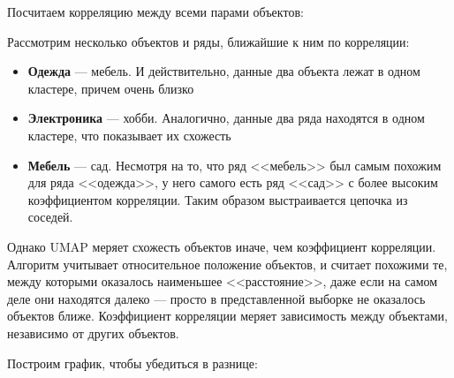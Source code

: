 Посчитаем корреляцию между всеми парами объектов:
\begin{figure}[H]
	\noindent {}
\end{figure}

Рассмотрим несколько объектов и ряды, ближайшие к ним по корреляции:
\begin{itemize}
	\item \textbf{Одежда} --- мебель. И действительно, данные два объекта лежат в одном кластере, причем очень близко
	\item \textbf{Электроника} --- хобби. Аналогично, данные два ряда находятся в одном кластере, что показывает их схожесть
	\item \textbf{Мебель} --- сад. Несмотря на то, что ряд <<мебель>> был самым похожим для ряда <<одежда>>, у него самого есть ряд <<сад>> с более высоким коэффициентом корреляции. Таким образом выстраивается цепочка из соседей.
\end{itemize}

Однако UMAP меряет схожесть объектов иначе, чем коэффициент корреляции. Алгоритм учитывает относительное положение объектов, и считает похожими те, между которыми оказалось наименьшее <<расстояние>>, даже если на самом деле они находятся далеко --- просто в представленной выборке не оказалось объектов ближе. Коэффициент корреляции меряет зависимость между объектами, независимо от других объектов.

Построим график, чтобы убедиться в разнице:
\begin{figure}[H]
	\noindent {}
\end{figure}

